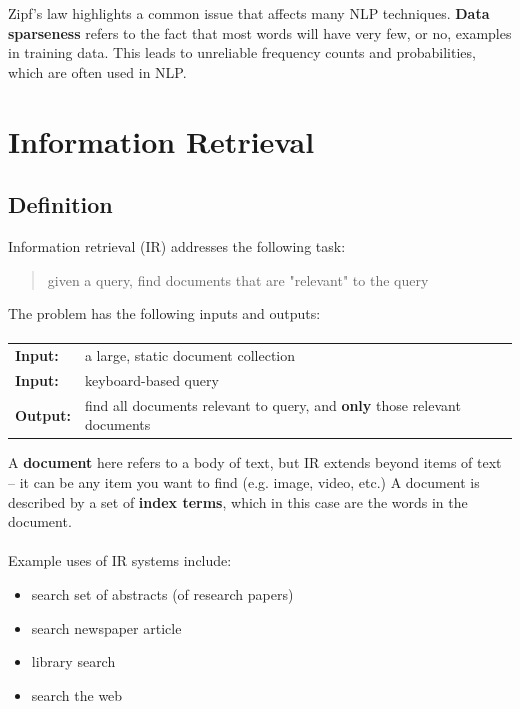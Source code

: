 \documentclass{article}
\begin{document}
Zipf's law highlights a common issue that affects many NLP techniques. \textbf{Data sparseness} refers to the fact that most words will have very few, or no, examples in training data. This leads to unreliable frequency counts and probabilities, which are often used in NLP.

\section{Information Retrieval}

\subsection{Definition}

Information retrieval (IR) addresses the following task:
\begin{quote}
	given a query, find documents that are "relevant" to the query
\end{quote}

The problem has the following inputs and outputs:
\paragraph{} \begin{tabular}{ll}
	\textbf{Input:} & a large, static document collection \\
	\textbf{Input:} & keyboard-based query \\
	\textbf{Output:} & find all documents relevant to query, and \textbf{only} those relevant documents \\
\end{tabular}

A \textbf{document} here refers to a body of text, but IR extends beyond items of text -- it can be any item you want to find (e.g. image, video, etc.) A document is described by a set of \textbf{index terms}, which in this case are the words in the document. 

\paragraph{}

Example uses of IR systems include:
\begin{itemize}
	\item search set of abstracts (of research papers)
	\item search newspaper article
	\item library search
	\item search the web
\end{itemize}
\end{document}
